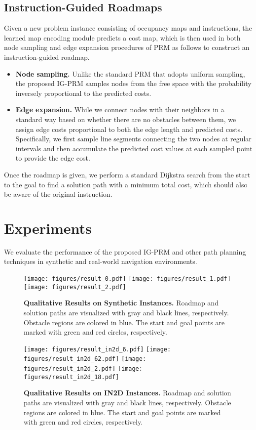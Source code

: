 \subsection{Instruction-Guided Roadmaps}
Given a new problem instance consisting of occupancy maps and instructions, the learned map encoding module predicts a cost map, which is then used in both node sampling and edge expansion procedures of PRM as follows to construct an instruction-guided roadmap.
\begin{itemize}
 \item \textbf{Node sampling.} Unlike the standard PRM that adopts uniform sampling, the proposed IG-PRM samples nodes from the free space with the probability inversely proportional to the predicted costs.
 \item \textbf{Edge expansion.} While we connect nodes with their neighbors in a standard way based on whether there are no obstacles between them, we assign edge costs proportional to both the edge length and predicted costs. Specifically, we first sample line segments connecting the two nodes at regular intervals and then accumulate the predicted cost values at each sampled point to provide the edge cost. 
\end{itemize}

Once the roadmap is given, we perform a standard Dijkstra search from the start to the goal to find a solution path with a minimum total cost, which should also be aware of the original instruction.


\section{Experiments}
We evaluate the performance of the proposed IG-PRM and other path planning techniques in synthetic and real-world navigation environments.

\begin{figure*}[t]
    \centering
    \texttt{[image: figures/result\_0.pdf]}    
    \texttt{[image: figures/result\_1.pdf]}   
    \texttt{[image: figures/result\_2.pdf]} 
    \caption{\textbf{Qualitative Results on Synthetic Instances.} Roadmap and solution paths are visualized with gray and black lines, respectively. Obstacle regions are colored in blue. The start and goal points are marked with green and red circles, respectively.}
    \label{fig:qualitative_results}
\end{figure*}

\begin{figure*}[t]
    \centering
    \texttt{[image: figures/result\_in2d\_6.pdf]} 
    \texttt{[image: figures/result\_in2d\_62.pdf]} 
    \texttt{[image: figures/result\_in2d\_2.pdf]} 
    \texttt{[image: figures/result\_in2d\_18.pdf]} 
    \caption{\textbf{Qualitative Results on IN2D Instances.} Roadmap and solution paths are visualized with gray and black lines, respectively. Obstacle regions are colored in blue. The start and goal points are marked with green and red circles, respectively.}
    \label{fig:qualitative_results_in2d}
\end{figure*}


